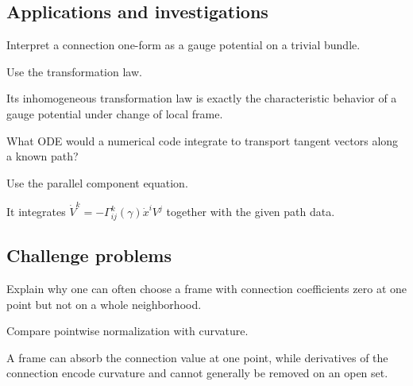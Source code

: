 \subsection*{Applications and investigations}

\begin{exercise}\label{exr:vii21-ped-13}
Interpret a connection one-form as a gauge potential on a trivial bundle.
\end{exercise}

\begin{hint}
Use the transformation law.
\end{hint}

\begin{solution}
Its inhomogeneous transformation law is exactly the characteristic behavior of a gauge potential under change of local frame.
\end{solution}

\begin{exercise}\label{exr:vii21-ped-14}
What ODE would a numerical code integrate to transport tangent vectors along a known path?
\end{exercise}

\begin{hint}
Use the parallel component equation.
\end{hint}

\begin{solution}
It integrates \(\dot V^k=-\Gamma^k_{ij}(\gamma)\dot x^iV^j\) together with the given path data.
\end{solution}

\subsection*{Challenge problems}

\begin{exercise}\label{exr:vii21-ped-15}
Explain why one can often choose a frame with connection coefficients zero at one point but not on a whole neighborhood.
\end{exercise}

\begin{hint}
Compare pointwise normalization with curvature.
\end{hint}

\begin{solution}
A frame can absorb the connection value at one point, while derivatives of the connection encode curvature and cannot generally be removed on an open set.
\end{solution}

